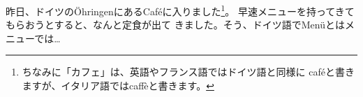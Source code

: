 
\usepackage[T1]{fontenc}
\usepackage{lmodern}

\showversion
昨日、ドイツの\"OhringenにあるCaf\'eに入りました\footnote{%
ちなみに「カフェ」は、英語やフランス語ではドイツ語と同様に
caf\'eと書きますが、イタリア語ではcaff\`eと書きます。}。
早速メニューを持ってきてもらおうとすると、なんと定食が出て
きました。そう、ドイツ語でMen\"uとはメニューでは…

